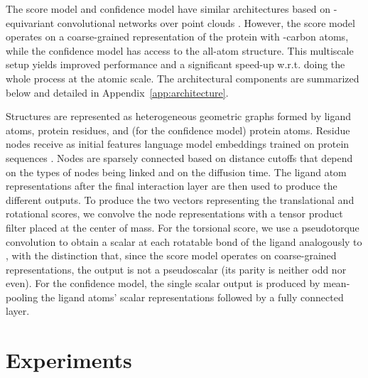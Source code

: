 \documentclass{article} \usepackage{iclr2023_conference,times}
\begin{document}
The score model and confidence model have similar architectures based on -equivariant convolutional networks over point clouds \citep{thomas2018tensor, e3nn}. However, the score model operates on a coarse-grained representation of the protein with -carbon atoms, while the confidence model has access to the all-atom structure. This multiscale setup yields improved performance and a significant speed-up w.r.t. doing the whole process at the atomic scale. The architectural components are summarized below and detailed in Appendix~\ref{app:architecture}.

Structures are represented as heterogeneous geometric graphs formed by ligand atoms, protein residues, and (for the confidence model) protein atoms. Residue nodes receive as initial features language model embeddings trained on protein sequences \citep{Lin2022ESM2}. Nodes are sparsely connected based on distance cutoffs that depend on the types of nodes being linked and on the diffusion time. The ligand atom representations after the final interaction layer are then used to produce the different outputs. To produce the two  vectors representing the translational and rotational scores, we convolve the node representations with a tensor product filter placed at the center of mass. For the torsional score, we use a pseudotorque convolution to obtain a scalar at each rotatable bond of the ligand analogously to \citet{jing2022torsional}, with the distinction that, since the score model operates on coarse-grained representations, the output is not a pseudoscalar (its parity is neither odd nor even). For the confidence model, the single scalar output is produced by mean-pooling the ligand atoms' scalar representations followed by a fully connected layer. 






\section{Experiments} \label{sec:experiments}
\end{document}
